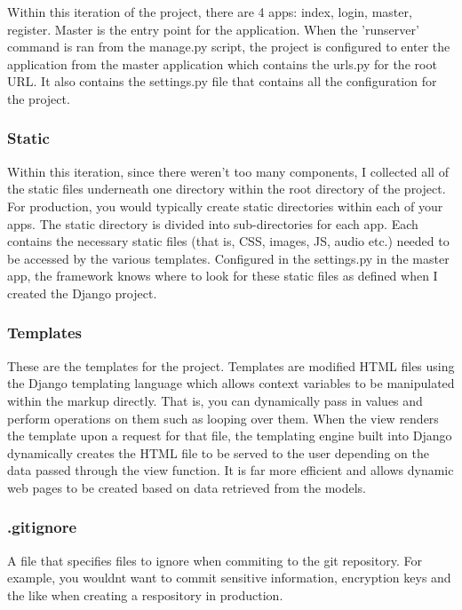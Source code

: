 \documentclass{article}
\begin{document}
Within this iteration of the project, there are 4 apps: index, login, master, register. Master is the entry point for the application. When the 'runserver' command is ran from the manage.py script, the project is configured to enter the application from the master application which contains the urls.py for the root URL. It also contains the settings.py file that contains all the configuration for the project. 

\subsubsection{Static}

Within this iteration, since there weren't too many components, I collected all of the static files underneath one directory within the root directory of the project. For production, you would typically create static directories within each of your apps. The static directory is divided into sub-directories for each app. Each contains the necessary static files (that is, CSS, images, JS, audio etc.) needed to be accessed by the various templates. Configured in the settings.py in the master app, the framework knows where to look for these static files as defined when I created the Django project. 

\subsubsection{Templates}

These are the templates for the project. Templates are modified HTML files using the Django templating language which allows context variables to be manipulated within the markup directly. That is, you can dynamically pass in values and perform operations on them such as looping over them. When the view renders the template upon a request for that file, the templating engine built into Django dynamically creates the HTML file to be served to the user depending on the data passed through the view function. It is far more efficient and allows dynamic web pages to be created based on data retrieved from the models. 

\subsubsection{.gitignore}

A file that specifies files to ignore when commiting to the git repository. For example, you wouldnt want to commit sensitive information, encryption keys and the like when creating a respository in production. 
\end{document}
